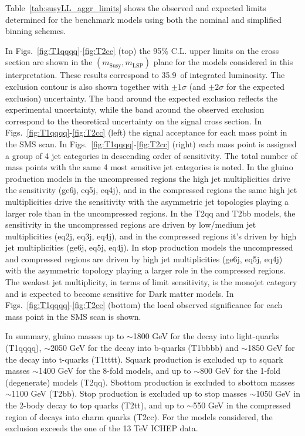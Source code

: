 Table~\ref{tab:susyLL_aggr_limits} shows the observed and expected limits
determined for the benchmark models using both the nominal and
simplified binning schemes. 

In Figs.~\ref{fig:T1qqqq}-\ref{fig:T2cc} (top) the 95\% C.L. upper
limits on the cross section are shown in the
$(m_{\mathrm{Susy}},m_{\mathrm{LSP}})$ plane for the models considered
in this interpretation. These results correspond to 35.9~\ifb of
integrated luminosity. The exclusion contour is also shown together
with $\pm1\sigma$ (and $\pm2\sigma$ for the expected exclusion)
uncertainty.  The band around the expected exclusion reflects the
experimental uncertainty, while the band around the observed exclusion
correspond to the theoretical uncertainty on the signal cross
section. In Figs.~\ref{fig:T1qqqq}-\ref{fig:T2cc} (left) the signal
acceptance for each mass point in the SMS scan. In
Figs.~\ref{fig:T1qqqq}-\ref{fig:T2cc} (right) each mass point is
assigned a group of 4 jet categories in descending order of
sensitivity. The total number of mass points with the same 4 most
sensitive jet categories is noted. In the gluino production models in
the uncompressed regions the high jet multiplicities drive the
sensitivity (ge6j, eq5j, eq4j), and in the compressed regions the same
high jet multiplicities drive the sensitivity with the asymmetric jet
topologies playing a larger role than in the uncompressed regions. In
the T2qq and T2bb models, the sensitivity in the uncompressed regions
are driven by low/medium jet multiplicities (eq2j, eq3j, eq4j), and in
the compressed regions it's driven by high jet multiplicities (ge6j,
eq5j, eq4j). In stop production models the uncompressed and compressed
regions are driven by high jet multiplicities (ge6j, eq5j, eq4j) with
the asymmetric topology playing a larger role in the compressed
regions.  The weakest jet multiplicity, in terms of limit sensitivity,
is the monojet category and is expected to become sensitive for Dark
matter models. In Figs.~\ref{fig:T1qqqq}-\ref{fig:T2cc} (bottom) the
local observed significance for each mass point in the SMS scan is
shown.

In summary, gluino masses up to $\sim$1800 GeV for the decay into
light-quarks (T1qqqq), $\sim$2050 GeV for the decay into b-quarks
(T1bbbb) and $\sim$1850 GeV for the decay into t-quarks
(T1tttt). Squark production is excluded up to squark masses $\sim$1400
GeV for the 8-fold models, and up to $\sim$800 GeV for the 1-fold
(degenerate) models (T2qq). Sbottom production is excluded to sbottom
masses $\sim$1100 GeV (T2bb).  Stop production is excluded up to stop
masses $\sim$1050 GeV in the 2-body decay to top quarks (T2tt), and up
to $\sim$550 GeV in the compressed region of decays into charm quarks
(T2cc).  For the models considered, the exclusion exceeds the one of
the 13 TeV ICHEP data.


